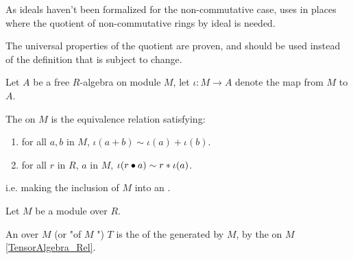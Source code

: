 \begin{remark}
    \label{mk:RingQuot}

    As ideals haven't been formalized for the non-commutative case, \Mathlib uses  in places
    where the quotient of non-commutative rings by ideal is needed.

    The universal properties of the quotient are proven, and should be used instead of the definition that is subject to change.
    
\end{remark}

\begin{definition}
    \label{TensorAlgebra_Rel}
    \leanok

    Let $A$ be a free $R$-algebra on module $M$, let $\iota : M \to A$ denote the map from $M$ to $A$.

    The  on $M$ is the equivalence relation satisfying:

    \begin{enumerate}

    \item for all $a, b$ in $M$, $\iota(a + b) \sim \iota(a) + \iota(b)$.
    \item for all $r$ in $R$, $a$ in $M$, $\iota(r \bullet a) \sim r * \iota(a)$.
    
    \end{enumerate}

    i.e. making the inclusion of $M$ into an .

\end{definition}

\begin{definition}
    \label{TensorAlgebra}

    Let $M$ be a module over $R$.

    An  over $M$ (or "of $M$ ") $T$ is the  of the  generated by $M$, 
    by the  on $M$ \ref{TensorAlgebra_Rel}.

\end{definition}

